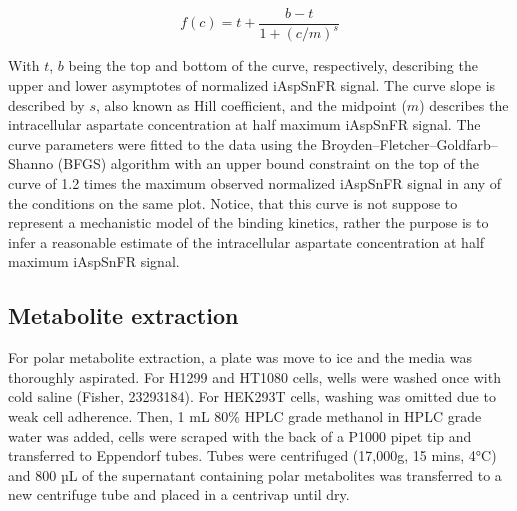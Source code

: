 \documentclass[9pt,lineno]{elife}
\begin{document}
$$
f(c) = t + \frac{b - t}{1 + (c/m)^s}
$$

With $t$, $b$ being the top and bottom of the curve, respectively, describing the upper and lower asymptotes of normalized iAspSnFR signal.
The curve slope is described by $s$, also known as Hill coefficient, and the midpoint ($m$) describes the intracellular aspartate concentration at half maximum iAspSnFR signal.
The curve parameters were fitted to the data using the Broyden–Fletcher–Goldfarb–Shanno (BFGS) algorithm with an upper bound constraint on the top of the curve of 1.2 times the maximum observed normalized iAspSnFR signal in any of the conditions on the same plot.
Notice, that this curve is not suppose to represent a mechanistic model of the binding kinetics, rather the purpose is to infer a reasonable estimate of the intracellular aspartate concentration at half maximum iAspSnFR signal.

\subsection{Metabolite extraction}
For polar metabolite extraction, a plate was move to ice and the media was thoroughly aspirated.
For H1299 and HT1080 cells, wells were washed once with cold saline (Fisher, 23293184).
For HEK293T cells, washing was omitted due to weak cell adherence.
Then, 1 mL 80\% HPLC grade methanol in HPLC grade water was added, cells were scraped with the back of a P1000 pipet tip and transferred to Eppendorf tubes.
Tubes were centrifuged (17,000g, 15 mins, 4°C) and 800 µL of the supernatant containing polar metabolites was transferred to a new centrifuge tube and placed in a centrivap until dry.
\end{document}
